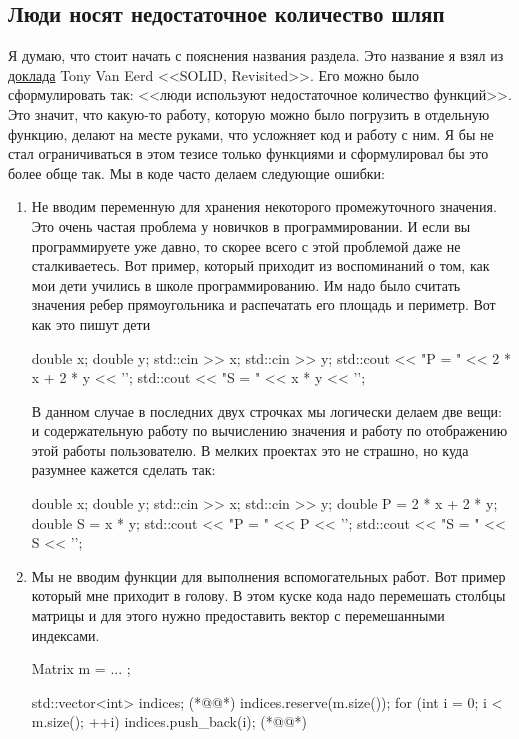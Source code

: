 \subsection{Люди носят недостаточное количество шляп}
\label{section::NotEnoughHats}

Я думаю, что стоит начать с пояснения названия раздела.
Это название я взял из \href{https://youtu.be/glYq-dvgby4?si=NCKw80I6LdvJx4OR}{доклада} Tony Van Eerd <<SOLID, Revisited>>.
Его можно было сформулировать так: <<люди используют недостаточное количество функций>>.
Это значит, что какую-то работу, которую можно было погрузить в отдельную функцию, делают на месте руками, что усложняет код и работу с ним.
Я бы не стал ограничиваться в этом тезисе только функциями и сформулировал бы это более обще так.
Мы в коде часто делаем следующие ошибки:
\begin{enumerate}
\item Не вводим переменную для хранения некоторого промежуточного значения.
Это очень частая проблема у новичков в программировании.
И если вы программируете уже давно, то скорее всего с этой проблемой даже не сталкиваетесь.
Вот пример, который приходит из воспоминаний о том, как мои дети учились в школе программированию.
Им надо было считать значения ребер прямоугольника и распечатать его площадь и периметр.
Вот как это пишут дети
\begin{cppcode}
double x;
double y;
std::cin >> x;
std::cin >> y;
std::cout << "P = " << 2 * x + 2 * y << '\n';
std::cout << "S = " << x * y << '\n';
\end{cppcode}
В данном случае в последних двух строчках мы логически делаем две вещи: и содержательную работу по вычислению значения и работу по отображению этой работы пользователю.
В мелких проектах это не страшно, но куда разумнее кажется сделать так:
\begin{cppcode}
double x;
double y;
std::cin >> x;
std::cin >> y;
double P = 2 * x + 2 * y;
double S = x * y;
std::cout << "P = " << P << '\n';
std::cout << "S = " << S << '\n';
\end{cppcode}

\item Мы не вводим функции для выполнения вспомогательных работ.
Вот пример который мне приходит в голову.
В этом куске кода надо перемешать столбцы матрицы и для этого нужно предоставить вектор с перемешанными индексами.
\begin{cppcode}
Matrix m = ... ;

std::vector<int> indices; (*@@*)
indices.reserve(m.size());
for (int i = 0; i < m.size(); ++i)
  indices.push_back(i); (*@@*)


\end{cppcode}
\end{enumerate}
